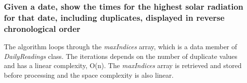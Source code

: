 \documentclass[12pt]{article}
\begin{document}
\subsubsection{Given a date, show the times for the highest solar radiation for that date, including duplicates, displayed in reverse chronological order}
The algorithm loops through the {\em maxIndices} array, which is a data member of {\em DailyReadings} class. The iterations depends on the number of duplicate values and has a linear complexity, O(n). The {\em maxIndices} array is retrieved and stored before processing and the space complexity is also linear. \\
\printbibliography[title=References]
\end{document}
